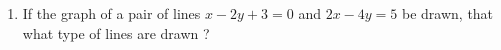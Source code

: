 %
\begin{enumerate}[label=\thesection.\arabic*.,ref=\thesection.\theenumi]
	\item If the graph of a pair of lines $ x - 2y + 3 = 0 $ and $ 2x - 4y = 5 $ be drawn, that what type of lines are drawn ? 
\end{enumerate}
%
